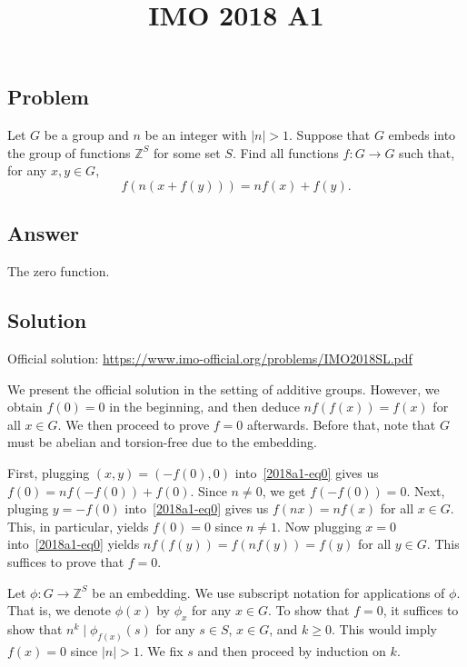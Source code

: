 \documentclass{article}
\title{IMO 2018 A1}
\author{}
\date{}
\newcommand{\Z}{\mathbb{Z}}
\begin{document}
\maketitle



\subsection*{Problem}

Let $G$ be a group and $n$ be an integer with $|n| > 1$.
Suppose that $G$ embeds into the group of functions $\Z^S$ for some set $S$.
Find all functions $f : G \to G$ such that, for any $x, y \in G$,
\[ f(n(x + f(y))) = n f(x) + f(y). \tag{*}\label{2018a1-eq0} \]



\subsection*{Answer}

The zero function.



\subsection*{Solution}

Official solution: \url{https://www.imo-official.org/problems/IMO2018SL.pdf}

We present the official solution in the setting of additive groups.
However, we obtain $f(0) = 0$ in the beginning, and then deduce $n f(f(x)) = f(x)$ for all $x \in G$.
We then proceed to prove $f = 0$ afterwards.
Before that, note that $G$ must be abelian and torsion-free due to the embedding.

First, plugging $(x, y) = (-f(0), 0)$ into~\eqref{2018a1-eq0} gives us $f(0) = n f(-f(0)) + f(0)$.
Since $n \neq 0$, we get $f(-f(0)) = 0$.
Next, pluging $y = -f(0)$ into~\eqref{2018a1-eq0} gives us $f(nx) = n f(x)$ for all $x \in G$.
This, in particular, yields $f(0) = 0$ since $n \neq 1$.
Now plugging $x = 0$ into~\eqref{2018a1-eq0} yields $n f(f(y)) = f(n f(y)) = f(y)$ for all $y \in G$.
This suffices to prove that $f = 0$.

Let $\phi : G \to \Z^S$ be an embedding.
We use subscript notation for applications of $\phi$.
That is, we denote $\phi(x)$ by $\phi_x$ for any $x \in G$.
To show that $f = 0$, it suffices to show that $n^k \mid \phi_{f(x)}(s)$ for any $s \in S$, $x \in G$, and $k \geq 0$.
This would imply $f(x) = 0$ since $|n| > 1$.
We fix $s$ and then proceed by induction on $k$.
\end{document}
